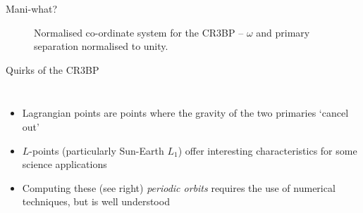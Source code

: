 \documentclass[10pt]{beamer}
\begin{document}
\begin{frame}{Mani-what?}
\begin{figure}
\begin{tikzpicture}
		\end{tikzpicture}
		\label{f:coordinatesystem}
			\caption{Normalised co-ordinate system for the CR3BP -- $\omega$ and primary separation normalised to unity.}	
		\end{figure}
\end{frame}


\begin{frame}[fragile]{Quirks of the CR3BP}
	\begin{columns}
			\begin{itemize}
				\item Lagrangian points are points where the gravity of the two primaries `cancel out'
				\item $L$-points (particularly Sun-Earth $L_1$) offer interesting characteristics for some science applications
				\item Computing these (see right) \textit{periodic orbits} requires the use of numerical techniques, but is well understood
			\end{itemize}
	\end{columns}

\end{frame}
\end{document}
